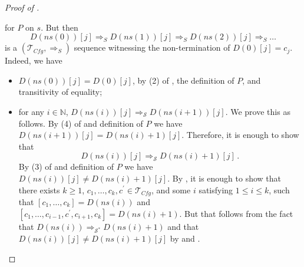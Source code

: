 \documentclass{article}
\newcommand{\Tcfg}{\mathcal{T}_{\mathit{Cfg}}}
\begin{document}
\begin{proof}[Proof of ]
\begin{itemize}
    for $P$ on $s$.
    But then
    \begin{equation*}
        D(\mathit{ns}(0))[j] \Rightarrow_S D(\mathit{ns}(1))[j] \Rightarrow_S D(\mathit{ns}(2))[j] \Rightarrow_S \ldots
    \end{equation*}
    is a $(\Tcfg, \Rightarrow_S)$ sequence witnessing the non-termination of $D(0)[j] = c_j$.
    Indeed, we have
    \begin{itemize}
        \item $D(\mathit{ns}(0))[j] = D(0)[j]$, by (2) of , the definition of $P$,
        and transitivity of equality;
        \item for any $i \in \mathbb{N}$, $D(\mathit{ns}(i))[j] \Rightarrow_{\mathcal{S}} D(\mathit{ns}(i+1))[j]$.
        We prove this as follows. By
        (4) of  and definition of $P$ we have
        $D(\mathit{ns}(i+1))[j] = D(\mathit{ns}(i)+1)[j]$.
        Therefore, it is enough to show that
        \begin{equation*}
            D(\mathit{ns}(i))[j] \Rightarrow_{\mathcal{S}} D(\mathit{ns}(i)+1)[j] \, .
        \end{equation*}
        By (3) of  and definition of $P$ we have
        $D(\mathit{ns}(i))[j] \not = D(\mathit{ns}(i)+1)[j]$.
        By , it is enough to show that there exists $k \geq 1$,
        $c_1,\ldots,c_k,c^\prime \in \Tcfg$, and some $i$ satisfying $1 \leq i \leq k$,
        such that
        $[c_1,\ldots,c_k] = D(\mathit{ns}(i))$
        and
        $[c_1,\ldots,c_{i-1},c^\prime,c_{i+1},c_k] = D(\mathit{ns}(i) + 1)$.
        But that follows from the fact that $D(\mathit{ns}(i)) \Rightarrow_{\mathcal{S}^*} D(\mathit{ns}(i) + 1)$
        and that $D(\mathit{ns}(i))[j] \not = D(\mathit{ns}(i)+1)[j]$
        by  and .
    \end{itemize}
\end{itemize}
\end{proof}
\end{document}
